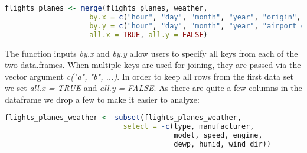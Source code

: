 \begin{lstlisting}[language=R]
flights_planes <- merge(flights_planes, weather,
                    by.x = c("hour", "day", "month", "year", "origin", "time_hour"),
                    by.y = c("hour", "day", "month", "year", "airport_code", "time_hour"),
                    all.x = TRUE, all.y = FALSE)
\end{lstlisting}
The function inputs \textit{by.x} and \textit{by.y} allow users to specify all keys from each of the two data.frames. When multiple keys are used for joining, they are passed via the vector argument \textit{c("a", "b", ...)}. In order to keep all rows from the first data set we set \textit{all.x = TRUE} and \textit{all.y = FALSE}.
As there are quite a few columns in the dataframe we drop a few to make it easier to analyze:
\begin{lstlisting}[language=R]
flights_planes_weather <- subset(flights_planes_weather,
                            select = -c(type, manufacturer,
                                        model, speed, engine,
                                        dewp, humid, wind_dir))
\end{lstlisting}

